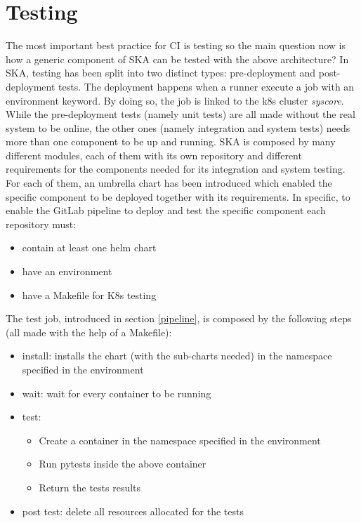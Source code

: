 \documentclass[a4paper]{spie}  %
\begin{document}
\section{Testing}
The most important best practice for CI is testing so the main question now is how a generic component of SKA can be tested with the above architecture?
In SKA, testing has been split into two distinct types: pre-deployment and post-deployment tests. The deployment happens when a runner execute a job with an environment keyword. By doing so, the job is linked to the k8s cluster \textit{syscore}.
While the pre-deployment tests (namely unit tests) are all made without the real system to be online, the other ones (namely integration and system tests) needs more than one component to be up and running.
SKA is composed by many different modules, each of them with its own repository and different requirements for the components needed for its integration and system testing. For each of them, an umbrella chart has been introduced which enabled the specific component to be deployed together with its requirements.
In specific, to enable the GitLab pipeline to deploy and test the specific component each repository must:
\begin{itemize}
    \item contain at least one helm chart
    \item have an environment
    \item have a Makefile for K8s testing
\end{itemize}

The test job, introduced in section \ref{pipeline}, is composed by the following steps (all made with the help of a Makefile):
\begin{itemize}
    \item install: installs the chart (with the sub-charts needed) in the namespace specified in the environment
    \item wait: wait for every container to be running
    \item test:
    \begin{itemize}
        \item Create a container in the namespace specified in the environment
        \item Run pytests inside the above container
        \item Return the tests results
    \end{itemize}
    \item post test: delete all resources allocated for the tests
\end{itemize}
\end{document}
